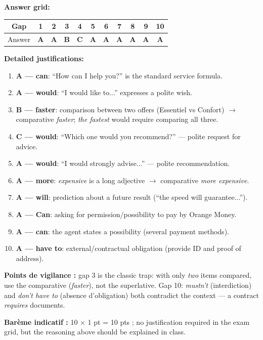 \documentclass[11pt]{article}
\begin{document}
\begin{corrige}
\textbf{Answer grid:}
\begin{center}
\begin{tabular}{|c|c|c|c|c|c|c|c|c|c|c|}\hline
Gap & 1 & 2 & 3 & 4 & 5 & 6 & 7 & 8 & 9 & 10 \\\hline
Answer & \textbf{A} & \textbf{A} & \textbf{B} & \textbf{C} & \textbf{A} & \textbf{A} & \textbf{A} & \textbf{A} & \textbf{A} & \textbf{A} \\\hline
\end{tabular}
\end{center}

\textbf{Detailed justifications:}
\begin{enumerate}
\item \textbf{A — can}: ``How can I help you?'' is the standard service formula.
\item \textbf{A — would}: ``I would like to...'' expresses a polite wish.
\item \textbf{B — faster}: comparison between two offers (Essentiel vs Confort) $\to$ comparative \emph{faster}; \emph{the fastest} would require comparing all three.
\item \textbf{C — would}: ``Which one would you recommend?'' — polite request for advice.
\item \textbf{A — would}: ``I would strongly advise...'' — polite recommendation.
\item \textbf{A — more}: \emph{expensive} is a long adjective $\to$ comparative \emph{more expensive}.
\item \textbf{A — will}: prediction about a future result (``the speed will guarantee...'').
\item \textbf{A — Can}: asking for permission/possibility to pay by Orange Money.
\item \textbf{A — can}: the agent states a possibility (several payment methods).
\item \textbf{A — have to}: external/contractual obligation (provide ID and proof of address).
\end{enumerate}
\textbf{Points de vigilance :} gap 3 is the classic trap: with only \emph{two} items compared, use the comparative (\emph{faster}), not the superlative. Gap 10: \emph{mustn't} (interdiction) and \emph{don't have to} (absence d'obligation) both contradict the context — a contract \emph{requires} documents.

\textbf{Barème indicatif :} 10 $\times$ 1 pt = 10 pts ; no justification required in the exam grid, but the reasoning above should be explained in class.
\end{corrige}
\end{document}
